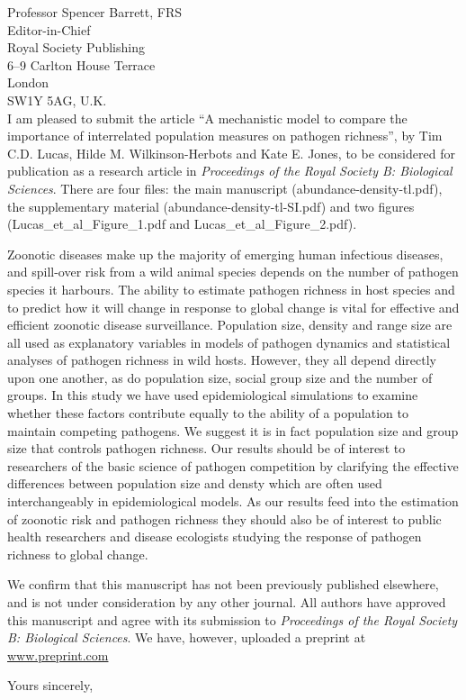 \documentclass[10pt, a4paper]{letter} %
\begin{document}
\begin{letter}{
Professor Spencer Barrett, FRS\\
Editor-in-Chief\\
Royal Society Publishing\\
6--9 Carlton House Terrace\\
London\\
SW1Y 5AG, U.K.\\

}
I am pleased to submit the article ``A mechanistic model to compare the importance of interrelated population measures on pathogen richness'', by Tim C.D. Lucas, Hilde M. Wilkinson-Herbots and Kate E. Jones, to be considered for publication as a research article in \emph{Proceedings of the Royal Society B: Biological Sciences}.
There are four files: the main manuscript (abundance-density-tl.pdf), the supplementary material (abundance-density-tl-SI.pdf) and two figures (Lucas\_et\_al\_Figure\_1.pdf and Lucas\_et\_al\_Figure\_2.pdf).

Zoonotic diseases make up the majority of emerging human infectious diseases, and spill-over risk from a wild animal species depends on the number of pathogen species it harbours.
The ability to estimate pathogen richness in host species and to predict how it will change in response to global change is vital for effective and efficient zoonotic disease surveillance.
Population size, density and range size are all used as explanatory variables in models of pathogen dynamics and statistical analyses of pathogen richness in wild hosts.
However, they all depend directly upon one another, as do population size, social group size and the number of groups.
In this study we have used epidemiological simulations to examine whether these factors contribute equally to the ability of a population to maintain competing pathogens.
We suggest it is in fact population size and group size that controls pathogen richness.
Our results should be of interest to researchers of the basic science of pathogen competition by clarifying the effective differences between population size and densty which are often used interchangeably in epidemiological models.
As our results feed into the estimation of zoonotic risk and pathogen richness they should also be of interest to public health researchers and disease ecologists studying the response of pathogen richness to global change.

We confirm that this manuscript has not been previously published elsewhere, and is not under consideration by any other journal. All authors have approved this manuscript and agree with its submission to \emph{Proceedings of the Royal Society B: Biological Sciences}.
We have, however, uploaded a preprint at \hyperref[www.preprint.com]{www.preprint.com} %

\closing{Yours sincerely,}




\end{letter}
\end{document}
